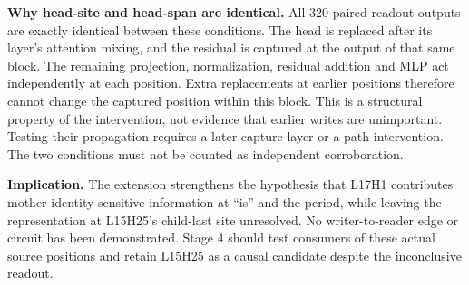 \documentclass[11pt,a4paper]{article}
\begin{document}
\textbf{Why head-site and head-span are identical.} All 320 paired readout outputs
are exactly identical between these conditions. The head is replaced after its
layer's attention mixing, and the residual is captured at the output of that same
block. The remaining projection, normalization, residual addition and MLP act
independently at each position. Extra replacements at earlier positions therefore
cannot change the captured position within this block. This is a structural property
of the intervention, not evidence that earlier writes are unimportant. Testing their
propagation requires a later capture layer or a path intervention. The two conditions
must not be counted as independent corroboration.

\textbf{Implication.} The extension strengthens the hypothesis that L17H1 contributes
mother-identity-sensitive information at ``is'' and the period, while leaving the
representation at L15H25's child-last site unresolved. No writer-to-reader edge or
circuit has been demonstrated. Stage 4 should test consumers of these actual source
positions and retain L15H25 as a causal candidate despite the inconclusive readout.
\end{document}
